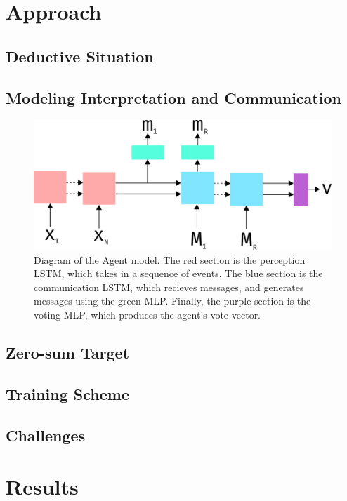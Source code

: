 \documentclass[10pt,twocolumn,letterpaper]{article}
\begin{document}
\section{Approach}
\subsection{Deductive Situation}
\subsection{Modeling Interpretation and Communication}
\begin{figure}
   \begin{center}
      \includegraphics[width=0.8 \textwidth]{img/model.png}
   \end{center}
      \caption{Diagram of the Agent model. The red section is the perception LSTM,
      which takes in a sequence of events. The blue section is the communication
      LSTM, which recieves messages, and generates messages using the green MLP.
      Finally, the purple section is the voting MLP, which produces the agent's
      vote vector.}
   \label{fig:model}
   \end{figure}
   
\subsection{Zero-sum Target}
\subsection{Training Scheme}
\subsection{Challenges}

\section{Results}
\end{document}
